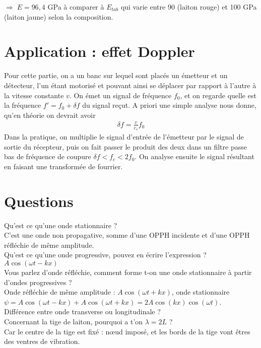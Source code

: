 \documentclass[12pt,prb,aps,epsf]{article}
\begin{document}
$\Rightarrow \; E = 96,4$ GPa  à comparer à $E_{tab}$ qui varie entre 90 (laiton rouge) et 100 GPa (laiton jaune) selon la composition.

\section{Application : effet Doppler}
Pour cette partie, on a un banc sur lequel sont placés un émetteur et un détecteur, l'un étant motorisé et pouvant ainsi se déplacer par rapport à l'autre à la vitesse constante $v$. On émet un signal de fréquence $f_0$, et on regarde quelle est la fréquence $f'=f_0+\delta f$ du signal reçut. A priori une simple analyse nous donne, qu'en théorie on devrait avoir 
\begin{eqnarray}
\delta f = \frac{v}{c_s}f_0
\end{eqnarray}	
Dans la pratique, on multiplie le signal d'entrée de l'émetteur par le signal de sortie du récepteur, puis on fait passer le produit des deux dans un filtre passe bas de fréquence de coupure $\delta f < f_c < 2f_0$. On analyse ensuite le signal résultant en faisant une transformée de fourrier.

\section*{Questions}
Qu'est ce qu'une onde stationnaire ? \\
C'est une onde non propagative, somme d'une OPPH incidente et d'une OPPH réfléchie de même amplitude.\\

Qu'est ce qu'une onde progressive, pouvez en écrire l'expression ?\\
$A \cos(\omega t - kx)$\\

Vous parlez d'onde réfléchie, comment forme t-on une onde stationnaire à partir d'ondes progressives ?\\
Onde réfléchie de même amplitude : $A\cos(\omega t + kx)$, onde stationnaire\\ $\psi = A \cos(\omega t - kx) + A \cos(\omega t + kx) = 2A \cos(kx)\cos(\omega t)$.\\

Différence entre onde transverse ou longitudinale ?\\

Concernant la tige de laiton, pourquoi a t'on $\lambda = 2L$ ?\\
Car le centre de la tige est fixé : nœud imposé, et les bords de la tige vont êtres des ventres de vibration.\\
\end{document}
